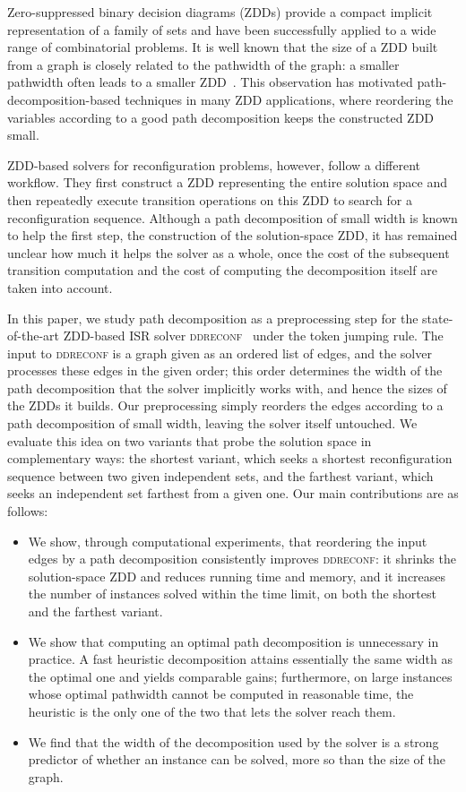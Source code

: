 \documentclass[conference]{IEEEtran}
\begin{document}
Zero-suppressed binary decision diagrams (ZDDs) provide a compact implicit
representation of a family of sets and have been successfully applied to a wide
range of combinatorial problems.
It is well known that the size of a ZDD built from a graph is closely related to
the pathwidth of the graph: a smaller pathwidth often leads to a smaller
ZDD~\cite{inoue16}.
This observation has motivated path-decomposition-based techniques in many ZDD
applications, where reordering the variables according to a good path
decomposition keeps the constructed ZDD small.

ZDD-based solvers for reconfiguration problems, however, follow a different
workflow.
They first construct a ZDD representing the entire solution space and then
repeatedly execute transition operations on this ZDD to search for a
reconfiguration sequence.
Although a path decomposition of small width is known to help the first step,
the construction of the solution-space ZDD, it has remained unclear how much it
helps the solver as a whole, once the cost of the subsequent transition
computation and the cost of computing the decomposition itself are taken into
account.

In this paper, we study path decomposition as a preprocessing step for the
state-of-the-art ZDD-based ISR solver \textsc{ddreconf}~\cite{ItoKNSSTT23} under
the token jumping rule.
The input to \textsc{ddreconf} is a graph given as an ordered list of edges, and
the solver processes these edges in the given order; this order determines the
width of the path decomposition that the solver implicitly works with, and hence
the sizes of the ZDDs it builds.
Our preprocessing simply reorders the edges according to a path decomposition of
small width, leaving the solver itself untouched.
We evaluate this idea on two variants that probe the solution space in
complementary ways: the shortest variant, which seeks a shortest reconfiguration
sequence between two given independent sets, and the farthest variant, which
seeks an independent set farthest from a given one.
Our main contributions are as follows:
\begin{itemize}
\item We show, through computational experiments, that reordering the input edges
by a path decomposition consistently improves \textsc{ddreconf}: it shrinks the
solution-space ZDD and reduces running time and memory, and it increases the
number of instances solved within the time limit, on both the shortest and the
farthest variant.
\item We show that computing an optimal path decomposition is unnecessary in
practice. A fast heuristic decomposition attains essentially the same width as
the optimal one and yields comparable gains; furthermore, on large instances
whose optimal pathwidth cannot be computed in reasonable time, the heuristic is
the only one of the two that lets the solver reach them.
\item We find that the width of the decomposition used by the solver is a strong
predictor of whether an instance can be solved, more so than the size of the
graph.
\end{itemize}
\end{document}
